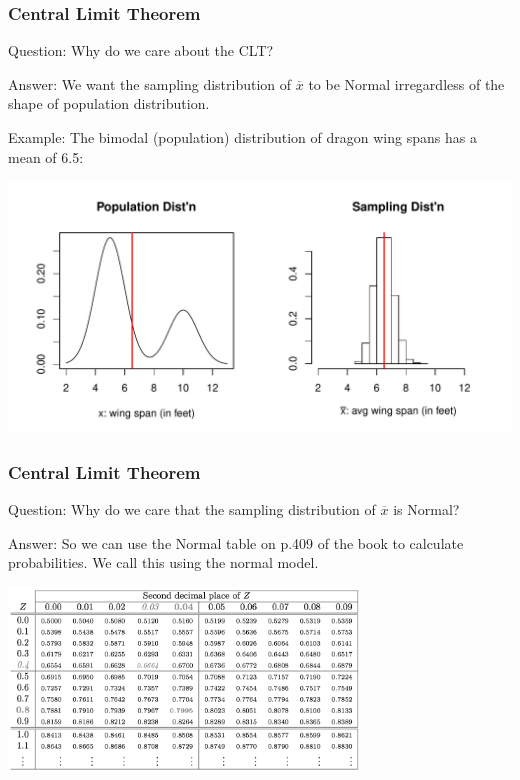 \documentclass[slides]{beamer}
\newcommand{\blue}[1]{\textcolor{blue2}{#1}}
\newcommand{\xbar}{\overline{x}}
\begin{document}
\begin{frame}
\frametitle{Central Limit Theorem}
\blue{Question}:  Why do we care about the CLT?

\vspace{0.25cm}

\blue{Answer}:  We want the sampling distribution of $\xbar$ to be Normal \blue{irregardless} of the shape of population distribution.

\vspace{0.25cm}

\blue{Example}:  The bimodal (population) distribution of dragon wing spans has a mean of 6.5:

\begin{center}
\includegraphics[width=\textwidth]{figure/CLT2.pdf}
\end{center}

\end{frame}


\begin{frame}
\frametitle{Central Limit Theorem}
\blue{Question}:  Why do we care that the sampling distribution of $\xbar$ is Normal?

\vspace{0.25cm}

\pause\blue{Answer}:  So we can use the Normal table on p.409 of the book to calculate probabilities.  We call this using the \blue{normal model}.

\vspace{0.25cm}

\begin{center}
\includegraphics[width=0.7\textwidth]{figure/normal_table.png}
\end{center}


\end{frame}
\end{document}
